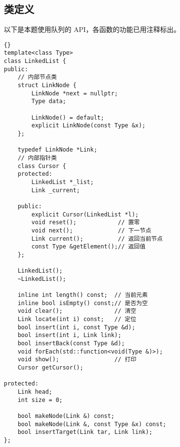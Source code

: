 \subsection{类定义}
以下是本题使用队列的 API，各函数的功能已用注释标出。
\begin{lstlisting}[morendkeywords={LinkedList}, firstnumber=637, caption=LinkedList 类定义]{}
template<class Type>
class LinkedList {
public: 
    // 内部节点类
    struct LinkNode {   
        LinkNode *next = nullptr;
        Type data;

        LinkNode() = default;
        explicit LinkNode(const Type &x);
    };

    typedef LinkNode *Link;
    // 内部指针类
    class Cursor {
    protected:
        LinkedList *_list;
        Link _current;

    public:
        explicit Cursor(LinkedList *l);
        void reset();            // 置零
        void next();             // 下一节点
        Link current();          // 返回当前节点
        const Type &getElement();// 返回值
    };

    LinkedList();
    ~LinkedList();

    inline int length() const;  // 当前元素
    inline bool isEmpty() const;// 是否为空
    void clear();               // 清空
    Link locate(int i) const;   // 定位
    bool insert(int i, const Type &d);
    bool insert(int i, Link link);
    bool insertBack(const Type &d);
    void forEach(std::function<void(Type &)>);
    void show();                // 打印
    Cursor getCursor();

protected:
    Link head;
    int size = 0;

    bool makeNode(Link &) const;
    bool makeNode(Link &, const Type &x) const;
    bool insertTarget(Link tar, Link link);
};
\end{lstlisting}

